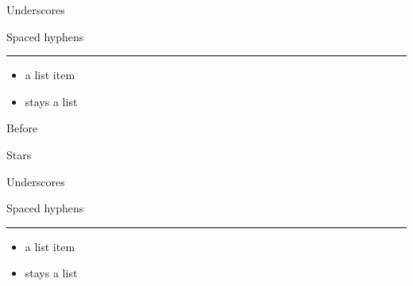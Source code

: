 \begin{frame}[t]

Underscores

\end{frame}

\begin{frame}[t]

Spaced hyphens

\par\addvspace{\medskipamount}
\noindent\rule{\linewidth}{0.4pt}
\par\addvspace{\medskipamount}

\begin{itemize}
\item a list item
\item stays a list
\end{itemize}
\end{frame}

\begin{frame}[t]
Before

\end{frame}

\begin{frame}[t]

Stars

\end{frame}

\begin{frame}[t]

Underscores

\end{frame}

\begin{frame}[t]

Spaced hyphens

\par\addvspace{\medskipamount}
\noindent\rule{\linewidth}{0.4pt}
\par\addvspace{\medskipamount}

\begin{itemize}
\item a list item
\item stays a list
\end{itemize}
\end{frame}

